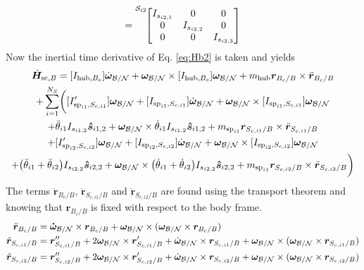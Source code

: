 \documentclass[paper]{aiaaNew}
\begin{document}
	\begin{equation}
	[I_{\text{sp}_{i2},S_{c,i2}}] = {\vphantom{\begin{bmatrix}
			I_{s_{i2,1}} & 0 & 0 \\
			0 & I_{s_{i2,2}} & 0 \\
			0 & 0 & I_{s_{i2,3}}
			\end{bmatrix}}}^{\mathcal{S}_{i2}\!}{\begin{bmatrix}
		I_{s_{i2,1}} & 0 & 0 \\
	0 & I_{s_{i2,2}} & 0 \\
0 & 0 & I_{s_{i2,3}}
\end{bmatrix}} 
	\end{equation}
	Now the inertial time derivative of Eq. \eqref{eq:Hb2} is taken and yields
	\begin{multline}
	\dot{\bm{H}}_{\text{sc},B} = [I_{\text{hub},B_c}] \dot{\bm\omega}_{\cal B/N} + \bm\omega_{\cal B/N} \times [I_{\text{hub},B_c}] \bm\omega_{\cal B/N} + m_{\text{hub}} \bm{r}_{B_c/B}\times\ddot{\bm r}_{B_c/B}\\ +\sum\limits_{i=1}^{N_S} \biggl( [I'_{\text{sp}_{i1},S_{c,i1}}] \bm\omega_{\cal B/N} + [I_{\text{sp}_{i1},S_{c,i1}}] \dot{\bm\omega}_{\cal B/N} + \bm\omega_{\cal B/N} \times [I_{\text{sp}_{i1},S_{c,i1}}] \bm\omega_{\cal B/N}\\ 
	+ \ddot{\theta}_{i1} I_{s_{i1,2}}\bm{\hat{s}}_{i1,2}+ \bm\omega_{\cal B/N} \times \dot{\theta}_{i1} I_{s_{i1,2}}\bm{\hat{s}}_{i1,2} +m_{\text{sp}_{i1}} \bm{r}_{S_{c,i1}/B} \times \ddot{\bm r}_{S_{c,i1}/B}\\
	+ [I'_{\text{sp}_{i2},S_{c,i2}}] \bm\omega_{\cal B/N} + [I_{\text{sp}_{i2},S_{c,i2}}] \dot{\bm\omega}_{\cal B/N} + \bm\omega_{\cal B/N} \times [I_{\text{sp}_{i2},S_{c,i2}}] \bm\omega_{\cal B/N}\\ 
	+ \big(\ddot{\theta}_{i1} + \ddot{\theta}_{i2}\big) I_{s_{i2,2}}\bm{\hat{s}}_{i2,2}+ \bm\omega_{\cal B/N} \times \big(\dot{\theta}_{i1} + \dot{\theta}_{i2}\big) I_{s_{i2,2}}\bm{\hat{s}}_{i2,2} +m_{\text{sp}_{i1}} \bm{r}_{S_{c,i2}/B} \times \ddot{\bm r}_{S_{c,i2}/B}\biggr)
	\label{eq:Hbdot}
	\end{multline}
	The terms $\ddot{\bm r}_{B_c/B}$, $\ddot{\bm r}_{S_{c,i1}/B}$ and $\ddot{\bm r}_{S_{c,i2}/B}$ are found using the transport theorem and knowing that $\bm{r}_{B_c/B}$ is fixed with respect to the body frame.
	\begin{align}
	\ddot{\bm r}_{B_c/B} &= \bm{\dot{\omega}}_{\cal B/N} \times \bm{r}_{B_c/B} + \bm\omega_{\cal B/N} \times (\bm\omega_{\cal B/N} \times \bm{r}_{B_c/B})
	\label{eq:rbddot}
	\\
	\ddot{\bm r}_{S_{c,i1}/B} &= \bm{r}''_{S_{c,i1}/B} + 2 \bm\omega_{\cal B/N} \times \bm{r}'_{S_{c,i1}/B} +  \dot{\bm\omega}_{\cal B/N} \times \bm{r}_{S_{c,i1}/B} + \bm\omega_{\cal B/N} \times (\bm\omega_{\cal B/N} \times \bm{r}_{S_{c,i1}/B})
	\label{eq:rsddot}
    \\
	\ddot{\bm r}_{S_{c,i2}/B} &= \bm{r}''_{S_{c,i2}/B} + 2 \bm\omega_{\cal B/N} \times \bm{r}'_{S_{c,i2}/B} +  \dot{\bm\omega}_{\cal B/N} \times \bm{r}_{S_{c,i2}/B} + \bm\omega_{\cal B/N} \times (\bm\omega_{\cal B/N} \times \bm{r}_{S_{c,i2}/B})
	\label{eq:rsddot2}
	\end{align}
\end{document}
